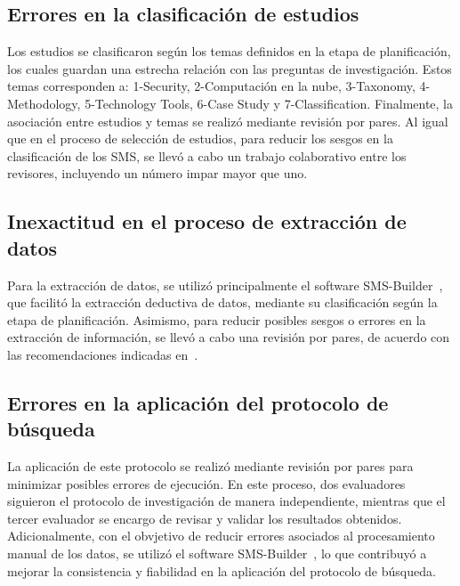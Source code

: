 \subsection{Errores en la clasificación de estudios}
Los estudios se clasificaron según los temas definidos en la etapa de planificación, los cuales guardan una estrecha relación con las 
preguntas de investigación. Estos temas corresponden a: 1-Security, 2-Computación en la nube, 3-Taxonomy, 4-Methodology, 5-Technology Tools, 
6-Case Study y 7-Classification.
Finalmente, la asociación entre estudios y temas se realizó mediante revisión por pares. Al igual que en el proceso de selección de 
estudios, para reducir los sesgos en la clasificación de los SMS, se llevó a cabo un trabajo colaborativo entre los revisores, 
incluyendo un número impar mayor que uno.

\subsection{Inexactitud en el proceso de extracción de datos}
Para la extracción de datos, se utilizó principalmente el software SMS-Builder~\cite{sms-builder-repo}, que facilitó la extracción 
deductiva de datos, mediante su clasificación según la etapa de planificación. Asimismo, para reducir posibles sesgos o errores en la 
extracción de información, se llevó a cabo una revisión por pares, de acuerdo con las recomendaciones indicadas en~\cite{Kitchenham2010}.

\subsection{Errores en la aplicación del protocolo de búsqueda}
La aplicación de este protocolo se realizó mediante revisión por pares para minimizar posibles errores de ejecución. En este proceso, 
dos evaluadores siguieron el protocolo de investigación de manera independiente, mientras que el tercer evaluador se encargo de revisar y 
validar los resultados obtenidos. Adicionalmente, con el obvjetivo de reducir errores asociados al procesamiento manual de los datos, se 
utilizó el software SMS-Builder~\cite{sms-builder-repo}, lo que contribuyó a mejorar la consistencia y fiabilidad en la aplicación del 
protocolo de búsqueda.
